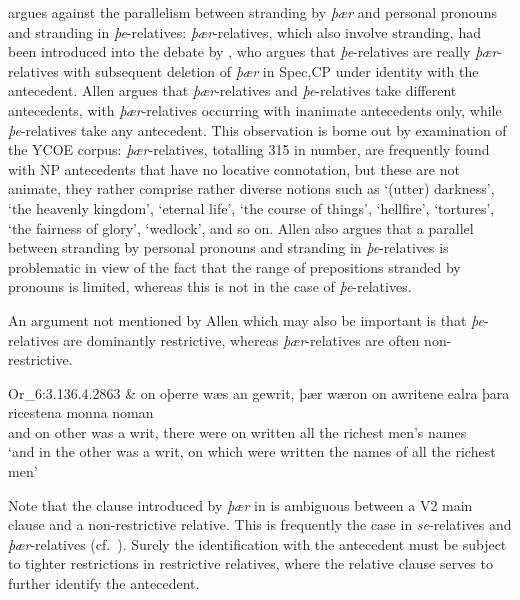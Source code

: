 \documentclass[output=paper]{langsci/langscibook}
\begin{document}
\citet{Allen1980} argues against the parallelism between stranding by
\textit{þær} and personal pronouns and stranding in \textit{þe}-relatives:
\textit{þær}-relatives, which also involve stranding, had been introduced into
the debate by \citet{Vat1978}, who argues that \textit{þe}-relatives are really
\textit{þær}-relatives with subsequent deletion of \textit{þær} in Spec,CP
under identity with the antecedent. Allen argues that \textit{þær}-relatives
and \textit{þe}-relatives take different antecedents, with
\textit{þær}-relatives occurring with inanimate antecedents only, while
\textit{þe}-relatives take any antecedent. This observation is borne out by
examination of the YCOE corpus: \textit{þær}-relatives, totalling 315 in
number, are frequently found with NP antecedents that have no locative
connotation, but these are not animate, they rather comprise rather
diverse notions such as \enquote*{(utter) darkness}, \enquote*{the heavenly
kingdom}, \enquote*{eternal life}, \enquote*{the course of things},
\enquote*{hellfire}, \enquote*{tortures}, \enquote*{the fairness of glory},
\enquote*{wedlock}, and so on. Allen also argues that a parallel between
stranding by personal pronouns and stranding in \textit{þe}-relatives is
problematic in view of the fact that the range of prepositions stranded by
pronouns is limited, whereas this is not in the case of
\textit{þe}-relatives.

An argument not mentioned by Allen which may also be important is that
\textit{þe}-relatives are dominantly restrictive, whereas
\textit{þær}-relatives are often non-re\-stric\-tive.\newpage

\ea Or\_6:3.136.4.2863%
    \label{ex:key:11.8}
    \sn
    \gll \& on oþerre wæs an gewrit, þær   wæron on awritene ealra þara ricestena monna noman\\
        and on other   was  a  writ,     there were    on written   all     the    richest men’s  names\\
    \glt ‘and in the other was a writ, on which were written the names of all the richest men’
\z

Note that the clause introduced by \textit{þær} in  is
ambiguous between a V2 main clause and a non-restrictive relative. This is
frequently the case in \textit{se}-relatives and \textit{þær}-relatives (cf.\
\citealt{LosvanKemenade2018}).  Surely the identification with the antecedent
must be subject to tighter restrictions in restrictive relatives, where the
relative clause serves to further identify the antecedent.
\end{document}
